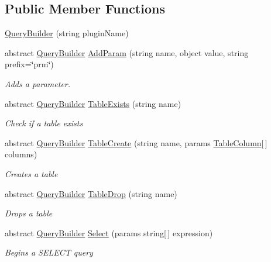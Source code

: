 \subsection*{Public Member Functions}
\begin{DoxyCompactItemize}
\item 
\hyperlink{class_o_t_a_1_1_data_1_1_query_builder_ac786540e347c7cd5adc9b5742d0d1101}{Query\+Builder} (string plugin\+Name)
\item 
abstract \hyperlink{class_o_t_a_1_1_data_1_1_query_builder}{Query\+Builder} \hyperlink{class_o_t_a_1_1_data_1_1_query_builder_a9156e1c582586f226c0127b822fca4a0}{Add\+Param} (string name, object value, string prefix=\char`\"{}prm\char`\"{})
\begin{DoxyCompactList}\small\item\em Adds a parameter. \end{DoxyCompactList}\item 
abstract \hyperlink{class_o_t_a_1_1_data_1_1_query_builder}{Query\+Builder} \hyperlink{class_o_t_a_1_1_data_1_1_query_builder_aa5be405cbb13a9dac5c43801793e6e9f}{Table\+Exists} (string name)
\begin{DoxyCompactList}\small\item\em Check if a table exists \end{DoxyCompactList}\item 
abstract \hyperlink{class_o_t_a_1_1_data_1_1_query_builder}{Query\+Builder} \hyperlink{class_o_t_a_1_1_data_1_1_query_builder_a156ab0761c75bd2242cf0b54906f8cf1}{Table\+Create} (string name, params \hyperlink{struct_o_t_a_1_1_data_1_1_table_column}{Table\+Column}\mbox{[}$\,$\mbox{]} columns)
\begin{DoxyCompactList}\small\item\em Creates a table \end{DoxyCompactList}\item 
abstract \hyperlink{class_o_t_a_1_1_data_1_1_query_builder}{Query\+Builder} \hyperlink{class_o_t_a_1_1_data_1_1_query_builder_a7f2f7d22038b57c3cc73155d47ca4c4c}{Table\+Drop} (string name)
\begin{DoxyCompactList}\small\item\em Drops a table \end{DoxyCompactList}\item 
abstract \hyperlink{class_o_t_a_1_1_data_1_1_query_builder}{Query\+Builder} \hyperlink{class_o_t_a_1_1_data_1_1_query_builder_a5379bda3407f4f8755ee4a14bb04f4d8}{Select} (params string\mbox{[}$\,$\mbox{]} expression)
\begin{DoxyCompactList}\small\item\em Begins a S\+E\+L\+E\+C\+T query \end{DoxyCompactList}\item 

\end{DoxyCompactItemize}
